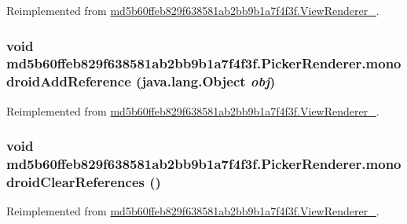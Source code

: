 Reimplemented from \hyperlink{classmd5b60ffeb829f638581ab2bb9b1a7f4f3f_1_1_view_renderer__2_a0898cf56fa9a49b653470eaf1608e77}{md5b60ffeb829f638581ab2bb9b1a7f4f3f.ViewRenderer\_}.\hypertarget{classmd5b60ffeb829f638581ab2bb9b1a7f4f3f_1_1_picker_renderer_c220cbf2703931a21301fff234bdcd51}{
\subsubsection[{monodroidAddReference}]{\setlength{\rightskip}{0pt plus 5cm}void md5b60ffeb829f638581ab2bb9b1a7f4f3f.PickerRenderer.monodroidAddReference (java.lang.Object {\em obj})}}
\label{classmd5b60ffeb829f638581ab2bb9b1a7f4f3f_1_1_picker_renderer_c220cbf2703931a21301fff234bdcd51}




Reimplemented from \hyperlink{classmd5b60ffeb829f638581ab2bb9b1a7f4f3f_1_1_view_renderer__2_64ca8244a89f60a47c173d9c0b15d610}{md5b60ffeb829f638581ab2bb9b1a7f4f3f.ViewRenderer\_}.\hypertarget{classmd5b60ffeb829f638581ab2bb9b1a7f4f3f_1_1_picker_renderer_1da45f3e35fc65d101c94408a81964f7}{
\subsubsection[{monodroidClearReferences}]{\setlength{\rightskip}{0pt plus 5cm}void md5b60ffeb829f638581ab2bb9b1a7f4f3f.PickerRenderer.monodroidClearReferences ()}}
\label{classmd5b60ffeb829f638581ab2bb9b1a7f4f3f_1_1_picker_renderer_1da45f3e35fc65d101c94408a81964f7}




Reimplemented from \hyperlink{classmd5b60ffeb829f638581ab2bb9b1a7f4f3f_1_1_view_renderer__2_dae20979ac761a65aa60c9b427509c37}{md5b60ffeb829f638581ab2bb9b1a7f4f3f.ViewRenderer\_}.

